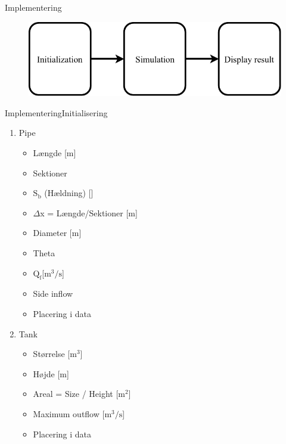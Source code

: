 \begin{frame}{Implementering}{}
 \vfill\vfill\centering  
\begin{figure}[H]
\centering
\includegraphics[width=0.75 \textwidth]{figures/Basic_implementation}
\label{fig:Basic_Implementering}
\end{figure}
 \vfill\vfill

\end{frame}
\begin{frame}{Implementering}{Initialisering}
    
\begin{table}[H]
\begin{enumerate} 
	\item Pipe
	\begin{itemize}
		\item Længde [m]
		\item Sektioner 
		\item $\text{S}_\text{b}$ (Hældning) [\textperthousand]
		\item $\Delta$x = Længde/Sektioner [m]
		\item Diameter [m]
		\item Theta 
		\item $\text{Q}_{\text{f}}$[$\text{m}^\text{3}/\text{s}$]
		\item Side inflow  
		\item Placering i data 
	\end{itemize}
	\item Tank
	\begin{itemize}
		\item Størrelse [$\text{m}^\text{3}$]
		\item Højde [m]
		\item Areal = Size / Height [$\text{m}^\text{2}$]
		\item Maximum outflow [$\text{m}^\text{3}/\text{s}$]
		\item Placering i data 
	\end{itemize}
	
\end{enumerate}
\label{tab:init_list}
\end{table}

\end{frame}


